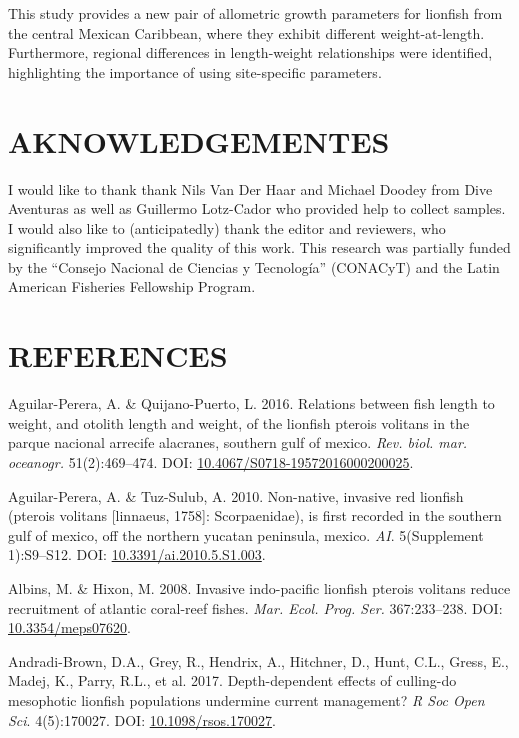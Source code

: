 \documentclass[12pt,]{article}
\begin{document}
This study provides a new pair of allometric growth parameters for
lionfish from the central Mexican Caribbean, where they exhibit
different weight-at-length. Furthermore, regional differences in
length-weight relationships were identified, highlighting the importance
of using site-specific parameters.

\section{AKNOWLEDGEMENTES}\label{aknowledgementes}

I would like to thank thank Nils Van Der Haar and Michael Doodey from
Dive Aventuras as well as Guillermo Lotz-Cador who provided help to
collect samples. I would also like to (anticipatedly) thank the editor
and reviewers, who significantly improved the quality of this work. This
research was partially funded by the ``Consejo Nacional de Ciencias y
Tecnología'' (CONACyT) and the Latin American Fisheries Fellowship
Program.

\section{REFERENCES}\label{references}

\hypertarget{refs}{}
\hypertarget{ref-aguilarperera_2016}{}
Aguilar-Perera, A. \& Quijano-Puerto, L. 2016. Relations between fish
length to weight, and otolith length and weight, of the lionfish pterois
volitans in the parque nacional arrecife alacranes, southern gulf of
mexico. \emph{Rev. biol. mar. oceanogr.} 51(2):469--474. DOI:
\href{https://doi.org/10.4067/S0718-19572016000200025}{10.4067/S0718-19572016000200025}.

\hypertarget{ref-aguilarperera_2010}{}
Aguilar-Perera, A. \& Tuz-Sulub, A. 2010. Non-native, invasive red
lionfish (pterois volitans {[}linnaeus, 1758{]}: Scorpaenidae), is first
recorded in the southern gulf of mexico, off the northern yucatan
peninsula, mexico. \emph{AI}. 5(Supplement 1):S9--S12. DOI:
\href{https://doi.org/10.3391/ai.2010.5.S1.003}{10.3391/ai.2010.5.S1.003}.

\hypertarget{ref-albins_2008}{}
Albins, M. \& Hixon, M. 2008. Invasive indo-pacific lionfish pterois
volitans reduce recruitment of atlantic coral-reef fishes. \emph{Mar.
Ecol. Prog. Ser.} 367:233--238. DOI:
\href{https://doi.org/10.3354/meps07620}{10.3354/meps07620}.

\hypertarget{ref-andradibrown_2017}{}
Andradi-Brown, D.A., Grey, R., Hendrix, A., Hitchner, D., Hunt, C.L.,
Gress, E., Madej, K., Parry, R.L., et al. 2017. Depth-dependent effects
of culling-do mesophotic lionfish populations undermine current
management? \emph{R Soc Open Sci}. 4(5):170027. DOI:
\href{https://doi.org/10.1098/rsos.170027}{10.1098/rsos.170027}.
\end{document}
